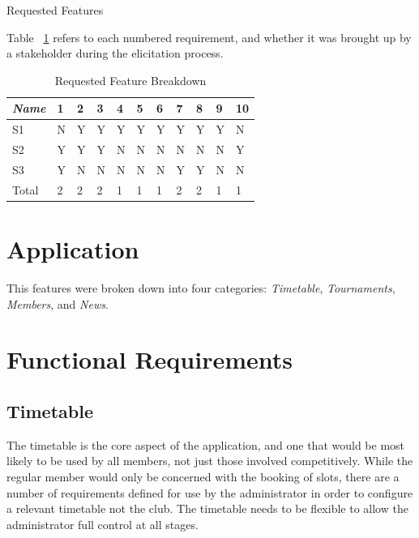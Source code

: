 \begin{table}[H]
\label{fig:requirementsFeatures}
\caption{Requested Features}
\end{table}
Table ~\ref{fig:reqbreakdown} refers to each numbered requirement, and whether it was brought up by a stakeholder during the elicitation process.
\begin{table}[H]
\caption{Requested Feature Breakdown}
\begin{center}
    \begin{tabular}{ | l | l | l | l| l| l| l| l| l|l| p{.22cm} |}
    \hline
     \textit{Name}& 1& 2 & 3 & 4 & 5 & 6 & 7 & 8 & 9 & 10\\ \hline
	 S1 & N & Y & Y & Y & Y & Y & Y & Y & Y & N\\ \hline
	 S2 & Y & Y & Y & N & N & N & N & N & N & Y\\ \hline
	 S3 & Y & N & N & N & N & N & Y & Y & N & N\\ \hline
  Total & 2 & 2 & 2 & 1 & 1 & 1 & 2 & 2 & 1 & 1\\ \hline
    \end{tabular}
\end{center}
\label{fig:reqbreakdown}
\end{table}





\section{Application}

This features were broken down into four categories: \textit{Timetable}, \textit{Tournaments}, \textit{Members}, and \textit{News}.

\section{Functional Requirements}

\subsection{Timetable} 

The timetable is the core aspect of the application, and one that would be most likely to be used by all members, not just those involved competitively. While the regular member would only be concerned with the booking of slots, there are a number of requirements defined for use by the administrator in order to configure a relevant timetable not the club. The timetable needs to be flexible to allow the administrator full control at all stages.

